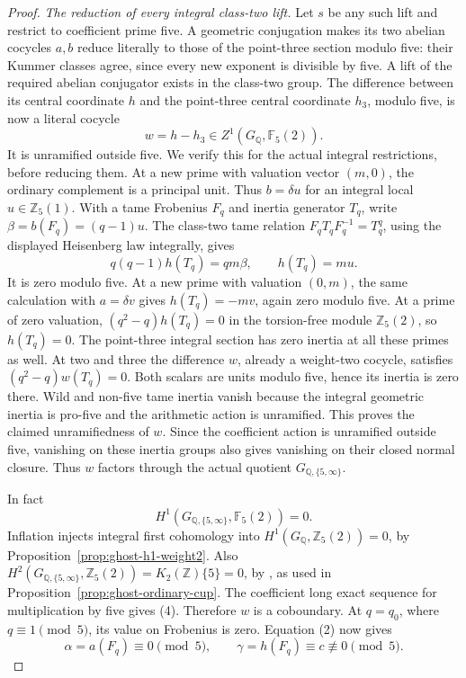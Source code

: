 \begin{proof}
\emph{The reduction of every integral class-two lift.}
Let \(s\) be any such lift and restrict to coefficient
prime five. A geometric conjugation makes its two
abelian cocycles \(a,b\) reduce literally to those
of the point-three section modulo five: their Kummer
classes agree, since every new exponent is divisible
by five. A lift of the required abelian conjugator
exists in the class-two group. The difference between
its central coordinate \(h\) and the point-three
central coordinate \(h_3\), modulo five, is now a
literal cocycle
\[
            w=h-h_3\in Z^1(G_{\mathbb Q},\mathbb F_5(2)).
\]
It is unramified outside five. We verify this for the
actual integral restrictions, before reducing them.
At a new prime with valuation vector \((m,0)\),
the ordinary complement is a principal unit. Thus
\(b=\delta u\) for an integral local
\(u\in\mathbb Z_5(1)\). With a tame Frobenius
\(F_q\) and inertia generator \(T_q\), write
\(\beta=b(F_q)=(q-1)u\). The class-two tame
relation \(F_qT_qF_q^{-1}=T_q^q\), using the
displayed Heisenberg law integrally, gives
\[
 q(q-1)h(T_q)=qm\beta,
              \qquad h(T_q)=mu.                 \tag{3}
\]
It is zero modulo five. At a new prime with valuation
\((0,m)\), the same calculation with
\(a=\delta v\) gives \(h(T_q)=-mv\), again
zero modulo five. At a prime of zero valuation,
\((q^2-q)h(T_q)=0\) in the torsion-free module
\(\mathbb Z_5(2)\), so \(h(T_q)=0\).
The point-three integral section has zero inertia
at all these primes as well. At two and three the
difference \(w\), already a weight-two cocycle,
satisfies \((q^2-q)w(T_q)=0\). Both scalars are
units modulo five, hence its inertia is zero there.
Wild and non-five tame inertia vanish because the
integral geometric inertia is pro-five and the
arithmetic action is unramified. This proves the
claimed unramifiedness of \(w\).
Since the coefficient action is unramified outside five,
vanishing on these inertia groups also gives vanishing on
their closed normal closure. Thus \(w\) factors through
the actual quotient \(G_{\mathbb Q,\{5,\infty\}}\).

In fact
\[
 H^1(G_{\mathbb Q,\{5,\infty\}},\mathbb F_5(2))=0.       \tag{4}
\]
Inflation injects integral first cohomology into
\(H^1(G_{\mathbb Q},\mathbb Z_5(2))=0\), by
Proposition~\ref{prop:ghost-h1-weight2}. Also
\(H^2(G_{\mathbb Q,\{5,\infty\}},\mathbb Z_5(2))
=K_2(\mathbb Z)\{5\}=0\), by
\cite[VI.8.2, Table VI.10.1.1]{GhostWeibelKbook},
as used in Proposition~\ref{prop:ghost-ordinary-cup}.
The coefficient long exact sequence for multiplication
by five gives (4). Therefore \(w\) is a coboundary.
At \(q=q_0\), where \(q\equiv1\pmod5\), its
value on Frobenius is zero. Equation (2) now gives
\[
 \alpha=a(F_q)\equiv0\pmod5,\qquad
 \gamma=h(F_q)\equiv c\not\equiv0\pmod5.           \tag{5}
\]


\end{proof}
